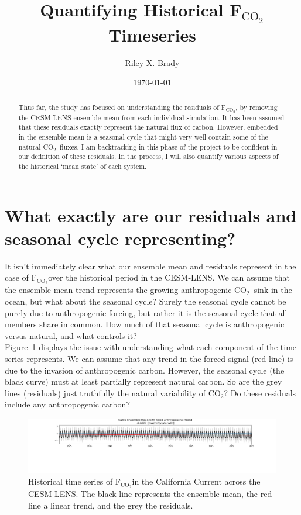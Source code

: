 \documentclass[12pt]{article}
\title{Quantifying Historical F$_{\mathrm{CO}_{2}}$ Timeseries}
\author{Riley X. Brady}
\date{\today}
\newcommand{\FCO}{F$_{\mathrm{CO}_{2}}$}
\newcommand{\CO}{CO$_{2}$}
\begin{document}
\maketitle
\begin{abstract}
\noindent Thus far, the study has focused on understanding the residuals of \FCO, by removing the CESM-LENS ensemble mean from each individual simulation. It has been assumed that these residuals exactly represent the natural flux of carbon. However, embedded in the ensemble mean is a seasonal cycle that might very well contain some of the natural \CO~fluxes. I am backtracking in this phase of the project to be confident in our definition of these residuals. In the process, I will also quantify various aspects of the historical `mean state' of each system.
\end{abstract}

\section{What exactly are our residuals and seasonal cycle representing?}
It isn't immediately clear what our ensemble mean and residuals represent in the case of \FCO over the historical period in the CESM-LENS. We can assume that the ensemble mean trend represents the growing anthropogenic \CO~sink in the ocean, but what about the seasonal cycle? Surely the seasonal cycle cannot be purely due to anthropogenic forcing, but rather it is the seasonal cycle that all members share in common. How much of that seasonal cycle is anthropogenic versus natural, and what controls it? \\

Figure~\ref{fig:calcs-timeseries} displays the issue with understanding what each component of the time series represents. We can assume that any trend in the forced signal (red line) is due to the invasion of anthropogenic carbon. However, the seasonal cycle (the black curve) must at least partially represent natural carbon. So are the grey lines (residuals) just truthfully the natural variability of \CO? Do these residuals include any anthropogenic carbon? \\
\clearpage
\begin{figure}[!h]
	\includegraphics[width=\linewidth]{figs/CalCS_timeseries.png}
	\caption{Historical time series of \FCO in the California Current across the CESM-LENS. The black line represents the ensemble mean, the red line a linear trend, and the grey the residuals.}
	\label{fig:calcs-timeseries}
\end{figure}
\end{document}
